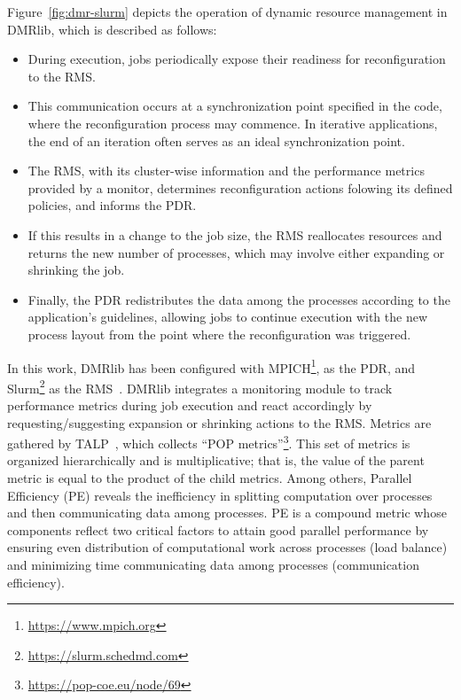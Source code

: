 \documentclass[a4paper,fleqn]{cas-dc}
\begin{document}
Figure~\ref{fig:dmr-slurm} depicts the operation of dynamic resource management in DMRlib, which is described as follows:

\begin{itemize}
\item During execution, jobs periodically expose their readiness for reconfiguration to the RMS.
\item This communication occurs at a synchronization point specified in the code, where the reconfiguration process may commence. In iterative applications, the end of an iteration often serves as an ideal synchronization point.
\item The RMS, with its cluster-wise information and the performance metrics provided by a monitor, determines reconfiguration actions folowing its defined policies, and informs the PDR.
\item If this results in a change to the job size, the RMS reallocates resources and returns the new number of processes, which may involve either expanding or shrinking the job.
\item Finally, the PDR redistributes the data among the processes according to the application's guidelines, allowing jobs to continue execution with the new process layout from the point where the reconfiguration was triggered.
\end{itemize}


In this work, DMRlib has been configured with MPICH\footnote{\url{https://www.mpich.org}}, as the PDR, and Slurm\footnote{\url{https://slurm.schedmd.com}} as the RMS~\cite{iserte_towards_2025}.
DMRlib integrates a monitoring module to track performance metrics during job execution and react accordingly by requesting/suggesting expansion or shrinking actions to the RMS.
Metrics are gathered by TALP~\cite{lopez_talp_2021}, which collects ``POP metrics''\footnote{\url{https://pop-coe.eu/node/69}}. This set of metrics is organized hierarchically and is multiplicative; that is, the value of the parent metric is equal to the product of the child metrics.
Among others, Parallel Efficiency (PE) reveals the inefficiency in splitting computation over processes and then communicating data among processes.
PE is a compound metric whose components reflect two critical factors to attain good parallel performance by ensuring even distribution of computational work across processes (load balance) and minimizing time communicating data among processes (communication efficiency).
\end{document}
